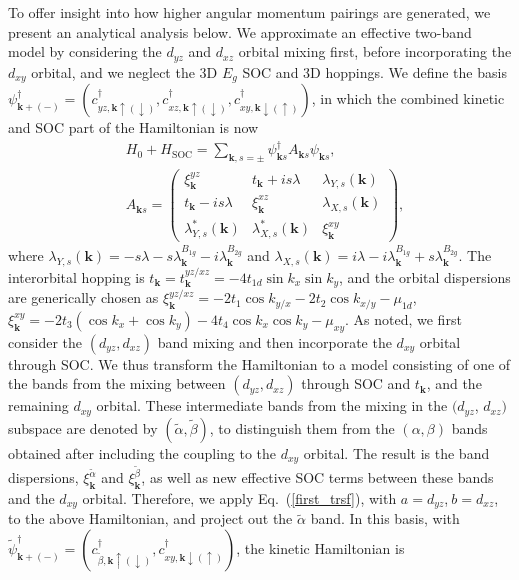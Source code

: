 \documentclass[%
reprint,
superscriptaddress,
 amsmath,amssymb,
 aps,
prb,
nobalancelastpage,
]{revtex4-2}
\begin{document}
To offer insight into how higher angular momentum pairings are generated, we present an analytical analysis below. We approximate an effective two-band model by considering the $d_{yz}$ and $d_{xz}$ orbital mixing first, before incorporating the $d_{xy}$ orbital, and we neglect the 3D $E_{g}$ SOC and 3D hoppings. We define the basis $\psi_{\textbf{k}+(-)}^{\dagger}=(c_{yz,\textbf{k}\uparrow(\downarrow)}^{\dagger},c_{xz,\textbf{k}\uparrow(\downarrow)}^{\dagger},c_{xy,\textbf{k}\downarrow(\uparrow)}^{\dagger})$, in which the combined kinetic and SOC part of the Hamiltonian is now
\begin{equation}
\label{3orbMatrix}
\begin{aligned}
&H_{0}+H_{\text{SOC}}=\sum_{\textbf{k},s=\pm}\psi_{\textbf{k}s}^{\dagger}A_{\textbf{k}s}\psi_{\textbf{k}s},\\[6pt]
&A_{\textbf{k}s} = 
 \begin{pmatrix} 
    \xi_{\textbf{k}}^{yz} & t_{\textbf{k}}+is\lambda & \lambda_{Y,s}(\textbf{k}) \\[7pt]
    t_{\textbf{k}}-is\lambda & \xi_{\textbf{k}}^{xz} &\lambda_{X,s}(\textbf{k}) \\[7pt]
    \lambda_{Y,s}^{*}(\textbf{k}) & \lambda_{X,s}^{*}(\textbf{k}) & \xi_{\textbf{k}}^{xy}
\end{pmatrix},
\end{aligned}
\end{equation}
where $\displaystyle \lambda_{Y,s}(\textbf{k}) = -s\lambda-s\lambda_{\textbf{k}}^{B_{1g}}-i\lambda_{\textbf{k}}^{B_{2g}}$ and $\displaystyle \lambda_{X,s}(\textbf{k}) = i\lambda -i\lambda_{\textbf{k}}^{B_{1g}} + s\lambda_{\textbf{k}}^{B_{2g}}$. The interorbital hopping is $t_{\textbf{k}} = t_{\textbf{k}}^{yz/xz
}=-4t_{1d}\sin{k_x}\sin{k_y}$, and the orbital dispersions are generically chosen as $\xi_{\textbf{k}}^{yz/xz} = -2t_{1}\cos{k_{y/x}}-2t_{2}\cos{k_{x/y}}-\mu_{1d}$, $\xi_{\textbf{k}}^{xy} = -2t_{3}(\cos{k_x}+\cos{k_y})-4t_{4}\cos{k_x}\cos{k_y}-\mu_{xy}$. As noted, we first consider the $(d_{yz},d_{xz})$ band mixing and then incorporate the $d_{xy}$ orbital through SOC. We thus transform the Hamiltonian to a model consisting of one of the bands from the mixing between $(d_{yz},d_{xz})$ through SOC and $t_{\textbf{k}}$, and the remaining $d_{xy}$ orbital. These intermediate bands from the mixing in the $(d_{yz}$, $d_{xz})$ subspace are denoted by $(\widetilde{\alpha}, \widetilde{\beta})$, to distinguish them from the $(\alpha, \beta)$ bands obtained after including the coupling to the $d_{xy}$ orbital. The result is the band dispersions, $\xi_{\textbf{k}}^{\widetilde{\alpha}}$ and $\xi_{\textbf{k}}^{\widetilde{\beta}}$, as well as new effective SOC terms between these bands and the $d_{xy}$ orbital.  Therefore, we apply Eq.~(\ref{first_trsf}), with $a=d_{yz}$,$~b=d_{xz}$, to the above Hamiltonian, and project out the $\widetilde{\alpha}$ band. In this basis, with $\widetilde{\psi}_{\textbf{k}+(-)}^{\dagger}=(c_{\widetilde{\beta},\textbf{k}\uparrow(\downarrow)}^{\dagger}, c_{xy,\textbf{k}\downarrow(\uparrow)}^{\dagger})$, the kinetic Hamiltonian is
\end{document}

